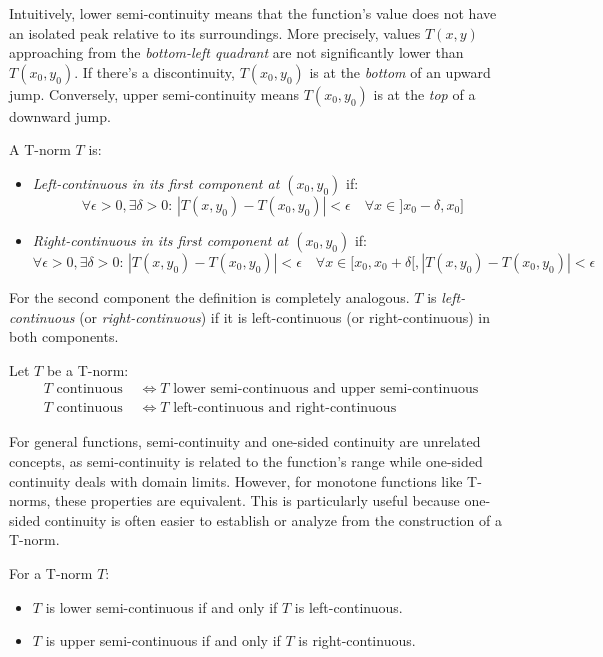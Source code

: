     Intuitively, lower semi-continuity means that the function's value does not have an isolated peak relative to its surroundings. More precisely, values $T(x,y)$ approaching from the \emph{bottom-left quadrant} are not significantly lower than $T(x_0,y_0)$. If there's a discontinuity, $T(x_0,
    y_0)$ is at the \emph{bottom} of an upward jump. Conversely, upper 
    semi-continuity means $T(x_0,y_0)$ is at the \emph{top} of a downward 
    jump.

\begin{definition}
A T-norm $T$ is:
\begin{itemize}
    \item \emph{Left-continuous in its first component at $(x_0,y_0)$} if:
    \[
    \forall \epsilon > 0, \exists \delta > 0 : \, |T(x,y_0) - T(x_0,y_0)| < \epsilon \quad \forall x \in ]x_0-\delta, x_0]
    \]
    \item \emph{Right-continuous in its first component at $(x_0,y_0)$} if:
    \[
    \forall \epsilon > 0, \exists \delta > 0 :\, |T(x,y_0) - T(x_0,y_0)| < \epsilon \quad \forall x \in [x_0, x_0+\delta[, |T(x,y_0) - T(x_0,y_0)| < \epsilon
    \]
\end{itemize}
For the second component the definition is completely analogous.
$T$ is \emph{left-continuous} (or \emph{right-continuous}) if it is left-continuous (or right-continuous) in both components.
\end{definition}

\begin{remark}
    Let $T$ be a T-norm:
      \begin{align*}
        T \text{ continuous } &\Leftrightarrow T \text{ lower semi-continuous and upper semi-continuous} \\
        T \text{ continuous } &\Leftrightarrow T \text{ left-continuous and right-continuous}
      \end{align*}
\end{remark}


For general functions, semi-continuity and one-sided continuity are unrelated concepts, as semi-continuity is related to the function's range while one-sided continuity deals with domain limits. However, for monotone functions like T-norms, these properties are equivalent. This is particularly useful because one-sided continuity is often easier to establish or analyze from the construction of a T-norm.\\
\begin{proposition}
For a T-norm $T$:
\begin{itemize}
    \item $T$ is lower semi-continuous if and only if $T$ is left-continuous.
    \item $T$ is upper semi-continuous if and only if $T$ is right-continuous.
\end{itemize}
\end{proposition}

